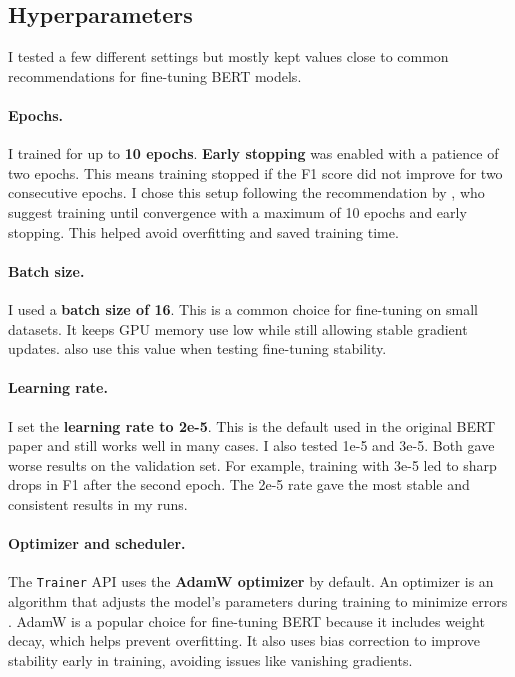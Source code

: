 \subsection{Hyperparameters}
    I tested a few different settings but mostly kept values close to common recommendations for fine-tuning BERT models.

    \paragraph{Epochs.} I trained for up to \textbf{10 epochs}. \textbf{Early stopping} was enabled with a patience of two epochs. This means training stopped if the F1 score did not improve for two consecutive epochs. I chose this setup following the recommendation by \citet{pecherComparingSpecialisedSmall2024}, who suggest training until convergence with a maximum of 10 epochs and early stopping. This helped avoid overfitting and saved training time.

    \paragraph{Batch size.} I used a \textbf{batch size of 16}. This is a common choice for fine-tuning on small datasets. It keeps GPU memory use low while still allowing stable gradient updates. \citet{mosbachStabilityFinetuningBERT2021} also use this value when testing fine-tuning stability.

    \paragraph{Learning rate.} I set the \textbf{learning rate to 2e-5}. This is the default used in the original BERT paper \citep{devlinBERTPretrainingDeep2019} and still works well in many cases. I also tested 1e-5 and 3e-5. Both gave worse results on the validation set. For example, training with 3e-5 led to sharp drops in F1 after the second epoch. The 2e-5 rate gave the most stable and consistent results in my runs.

    \paragraph{Optimizer and scheduler.} The \texttt{Trainer} API uses the \textbf{AdamW optimizer} by default. An optimizer is an algorithm that adjusts the model’s parameters during training to minimize errors \citep{mosbachStabilityFinetuningBERT2021}. AdamW is a popular choice for fine-tuning BERT because it includes weight decay, which helps prevent overfitting. It also uses bias correction to improve stability early in training, avoiding issues like vanishing gradients.

